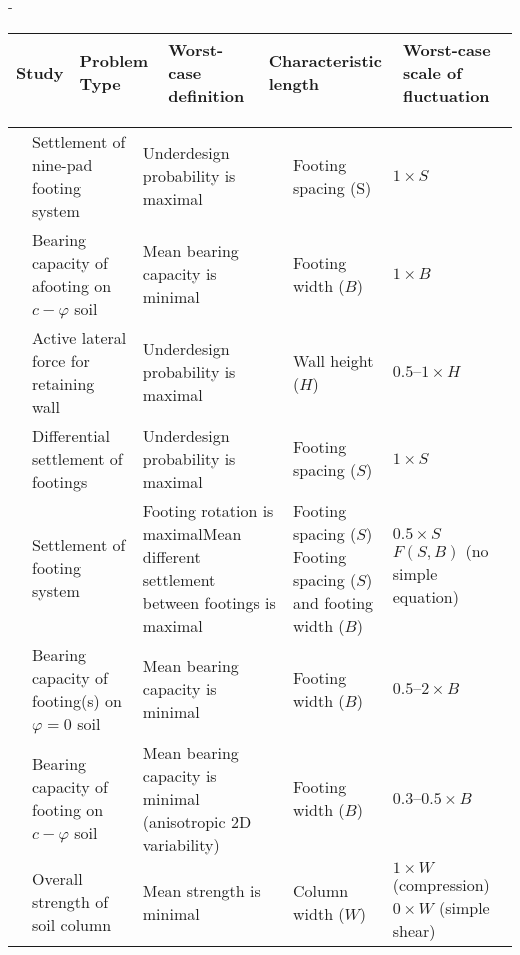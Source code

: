 \begin{table}[htb]
    \centering
    \footnotesize-
    \label{table:1}
    \tabcolsep=1mm
    \begin{tabular}{b{} b{} b{} b{} b{}}
        \toprule
        Study & Problem Type & Worst-case definition & Characteristic length & Worst-case scale of fluctuation \\
        \midrule
    \end{tabular}
    \begin{tabular}{p{} p{} p{} b{} p{}}
        \citet{Jaksa2005109} & Settlement of nine-pad footing system & Underdesign probability is maximal & Footing spacing (S) & $1\times S$ \\
        \citet{Fenton200354} & Bearing capacity of afooting on $c-\varphi$ soil & Mean bearing capacity is minimal & Footing width ($B$) & $1\times B$ \\
        \citet{Soubra200866} \citet{Fenton200555} & Active lateral force for retaining wall & Underdesign probability is maximal & Wall height ($H$) & $0.5–1\times H$ \\
        \citet{Fenton2005232} & Differential settlement of footings & Underdesign probability is maximal & Footing spacing ($S$) & $1\times S$ \\
        \citet{Breysse2005143} & Settlement of footing system & Footing rotation is maximal\newline Mean different settlement between footings is maximal & Footing spacing ($S$) Footing spacing ($S$) and footing width ($B$) & $0.5\times S$\newline $F(S,B)$ \newline(no simple equation) \\
        \citet{Griffiths2006421} & Bearing capacity of footing(s) on $\varphi=0$ soil & Mean bearing capacity is minimal & Footing width ($B$) & $0.5–2\times B$ \\
        \citet{Vessia2009103} & Bearing capacity of footing on $c-\varphi$ soil & Mean bearing capacity is minimal (anisotropic 2D variability)  & Footing width ($B$) & $0.3–0.5\times B$ \\
        \citet{Ching2013a,Ching2013b} & Overall strength of soil column & Mean strength is minimal & Column width ($W$) & $1\times W$ (compression)\newline $0\times W$ (simple shear) \\

\end{tabular}
\end{table}
